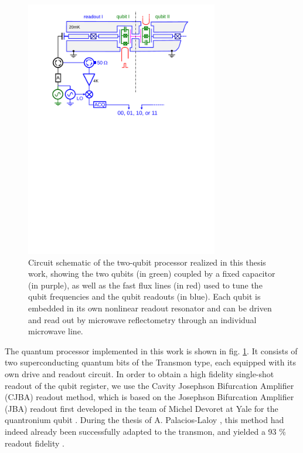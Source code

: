 %
\begin{figure}[ht!]
 \centering \includegraphics[width=0.75\textwidth]{./material/papers/grover/figures/2_qubit_processor_schematic}
\caption[Circuit schematic of the realized two-qubit processor]{Circuit schematic of the two-qubit processor realized in this thesis work, showing the two qubits (in green) coupled by
a fixed capacitor (in purple), as well as the fast flux lines (in
red) used to tune the qubit frequencies and the qubit readouts (in
blue). Each qubit is embedded in its own nonlinear readout resonator
and can be driven and read out by microwave reflectometry through an individual microwave line.}


\label{fig:two_qubit_processor_schematic} %
\end{figure}


The quantum processor implemented in this work is shown in fig. \ref{fig:two_qubit_processor_schematic}.
It consists of two superconducting quantum bits of the Transmon type,
each equipped with its own drive and readout circuit. In order to
obtain a high fidelity single-shot readout of the qubit register,
we use the Cavity Josephson Bifurcation Amplifier (CJBA) readout method, which is based on the Josephson Bifurcation Amplifier (JBA) readout first
developed in the team of Michel Devoret at Yale for the quantronium
qubit \citep{siddiqi_rf-driven_2004,vijay_invited_2009,siddiqi_dispersive_2006}. During the thesis of A. Palacios-Laloy \citep{palacios-laloy_superconducting_2010}, this method had indeed already been successfully adapted to the transmon, and
yielded a 93 \% readout fidelity \citep{mallet_single-shot_2009}.

